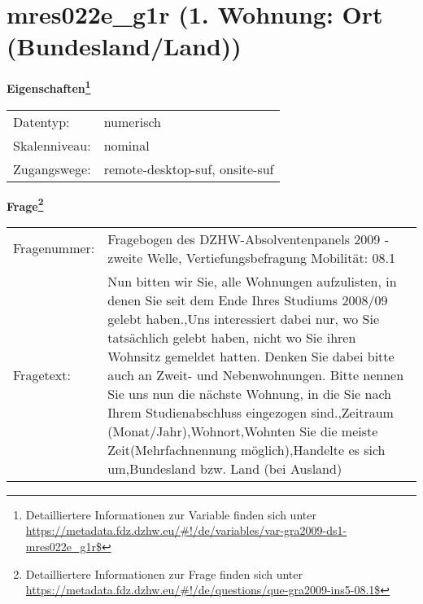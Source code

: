 
    \setcounter{footnote}{0}

    \vspace*{-1.8cm}
	\section{mres022e\_g1r (1. Wohnung: Ort (Bundesland/Land))}
	\label{section:mres022e_g1r}



    \vspace*{0.5cm}
    \noindent\textbf{Eigenschaften\footnote{Detailliertere Informationen zur Variable finden sich unter
		\url{https://metadata.fdz.dzhw.eu/\#!/de/variables/var-gra2009-ds1-mres022e_g1r$}}}\\
	\begin{tabularx}{\hsize}{@{}lX}
	Datentyp: & numerisch \\
	Skalenniveau: & nominal \\
	Zugangswege: &
	  remote-desktop-suf, 
	  onsite-suf
 \\
    \end{tabularx}



				\vspace*{0.5cm}
                \noindent\textbf{Frage\footnote{Detailliertere Informationen zur Frage finden sich unter
		              \url{https://metadata.fdz.dzhw.eu/\#!/de/questions/que-gra2009-ins5-08.1$}}}\\
				\begin{tabularx}{\hsize}{@{}lX}
					Fragenummer: &
					  Fragebogen des DZHW-Absolventenpanels 2009 - zweite Welle, Vertiefungsbefragung Mobilität:
					  08.1
 \\
					Fragetext: & Nun bitten wir Sie, alle Wohnungen aufzulisten, in denen Sie seit dem Ende Ihres Studiums 2008/09 gelebt haben.,Uns interessiert dabei nur, wo Sie tatsächlich gelebt haben, nicht wo Sie ihren Wohnsitz gemeldet hatten. Denken Sie dabei bitte auch an Zweit- und Nebenwohnungen. Bitte nennen Sie uns nun die nächste Wohnung, in die Sie nach Ihrem Studienabschluss eingezogen sind.,Zeitraum (Monat/Jahr),Wohnort,Wohnten Sie die meiste Zeit(Mehrfachnennung möglich),Handelte es sich um,Bundesland bzw. Land (bei Ausland) \\
				\end{tabularx}





